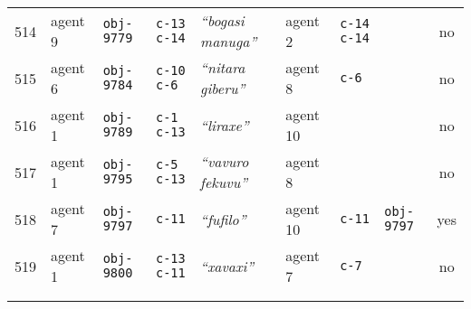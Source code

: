 {{\begin{tabular}{llllllllc}
514 & agent 9 & \texttt{obj-9779} & \texttt{c-13 c-14} & \textit{``bogasi manuga''} & agent 2 & \texttt{c-14 c-14} & \texttt{} & no \\
515 & agent 6 & \texttt{obj-9784} & \texttt{c-10 c-6} & \textit{``nitara giberu''} & agent 8 & \texttt{c-6} & \texttt{} & no \\
516 & agent 1 & \texttt{obj-9789} & \texttt{c-1 c-13} & \textit{``liraxe''} & agent 10 & \texttt{} & \texttt{} & no \\
517 & agent 1 & \texttt{obj-9795} & \texttt{c-5 c-13} & \textit{``vavuro fekuvu''} & agent 8 & \texttt{} & \texttt{} & no \\
518 & agent 7 & \texttt{obj-9797} & \texttt{c-11} & \textit{``fufilo''} & agent 10 & \texttt{c-11} & \texttt{obj-9797} & yes \\
519 & agent 1 & \texttt{obj-9800} & \texttt{c-13 c-11} & \textit{``xavaxi''} & agent 7 & \texttt{c-7} & \texttt{} & no \\
\\[2.0em]
 \\\end{tabular}}
}




